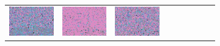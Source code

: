 \documentclass{ipol}
\begin{document}
\begin{figure}[ht]
\begin{subfigure}[t]{\linewidth}
\begin{tabular}{ccccccccc}
                \includegraphics[width=\s]{images/flowers/DHT/bid_n5_64_grids.png}&
                \includegraphics[width=\s]{images/flowers/LINEAR/bid_n5_64_grids.png}&
                \includegraphics[width=\s]{images/flowers/PPG/bid_n5_64_grids.png}&

\end{tabular}
\end{subfigure}
\end{figure}
\end{document}
